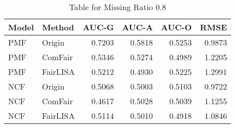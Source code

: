 \begin{table}
\centering
\caption{Table for Missing Ratio 0.8}
\label{tab:missing_0.8}
\begin{tabular}{llrrrr}
\toprule
Model &   Method &  AUC-G &  AUC-A &  AUC-O &   RMSE \\
\midrule
  PMF &   Origin & 0.7203 & 0.5818 & 0.5253 & 0.9873 \\
  PMF &  ComFair & 0.5346 & 0.5274 & 0.4989 & 1.2205 \\
  PMF & FairLISA & 0.5212 & 0.4930 & 0.5225 & 1.2991 \\
  NCF &   Origin & 0.5068 & 0.5003 & 0.5103 & 0.9722 \\
  NCF &  ComFair & 0.4617 & 0.5028 & 0.5039 & 1.1255 \\
  NCF & FairLISA & 0.5114 & 0.5010 & 0.4918 & 1.0846 \\
\bottomrule
\end{tabular}
\end{table}
